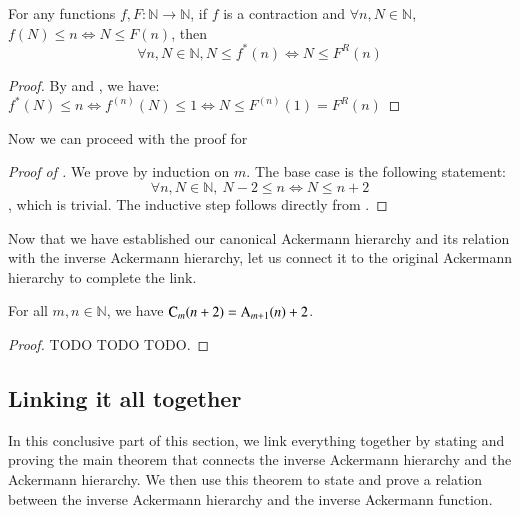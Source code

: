 \begin{lem}  \label{lem: countdown_rep_app}
For any functions $f, F: \mathbb{N} \to \mathbb{N}$, if $f$ is a contraction and $\forall n, N\in \mathbb{N}$, $f(N) \le n \iff N \le F(n)$, then
$$ \forall n, N\in \mathbb{N}, N\le f^*(n) \iff N \le F^R(n) $$
\end{lem}

\begin{proof}
By  and , we have:
$\displaystyle f^*(N)\le n \iff f^{(n)}(N) \le 1 \iff N \le F^{(n)}(1) = F^R(n) $
\end{proof}

Now we can proceed with the proof for 

\begin{proof}[Proof of ]
We prove by induction on $m$. The base case is the following statement:
$$ \forall n, N\in \mathbb{N}, \ N - 2\le n \iff N \le n + 2 $$
, which is trivial. The inductive step follows directly from .
\end{proof}

Now that we have established our canonical Ackermann hierarchy and its relation with the inverse Ackermann hierarchy, let us connect it to the original Ackermann hierarchy to complete the link.

\begin{thm} \label{thm: can_ack_ack}
For all $m, n\in \mathbb{N}$, we have $\text{C}_m(n+2) = \text{A}_{m+1}(n) + 2$.
\end{thm}

\begin{proof} TODO TODO TODO.
%
%
\end{proof}

\subsection{Linking it all together}

In this conclusive part of this section, we link everything together by stating and proving the main theorem that connects the inverse Ackermann hierarchy and the Ackermann hierarchy. We then use this theorem to state and prove a relation between the inverse Ackermann hierarchy and the inverse Ackermann function.

